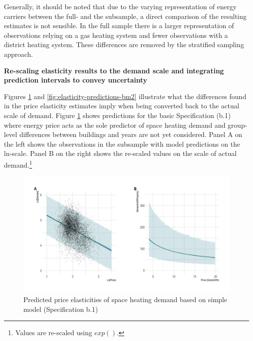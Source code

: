 \documentclass[12pt,twoside]{reedthesis}
\begin{document}
Generally, it should be noted that due to the varying representation of energy carriers between the full- and the subsample, a direct comparison of the resulting estimates is not sensible. In the full sample there is a larger representation of observations relying on a gas heating system and fewer observations with a district heating system. These differences are removed by the stratified sampling approach.

\textbf{Re-scaling elasticity results to the demand scale and integrating prediction intervals to convey uncertainty}

Figures \ref{fig:elasticity-predictions-b1} and \ref{fig:elasticity-predictions-bm2} illustrate what the differences found in the price elasticity estimates imply when being converted back to the actual scale of demand. Figure \ref{fig:elasticity-predictions-b1} shows predictions for the basic Specification (b.1) where energy price acts as the sole predictor of space heating demand and group-level differences between buildings and years are not yet considered. Panel A on the left shows the observations in the subsample with model predictions on the ln-scale. Panel B on the right shows the re-scaled values on the scale of actual demand.\footnote{Values are re-scaled using \(exp()\).}
\begin{figure}

{\centering \includegraphics[width=1\linewidth]{figure/b1_prediction} 

}

\caption{Predicted price elasticities of space heating demand based on simple model (Specification b.1)}\label{fig:elasticity-predictions-b1}
\end{figure}
\end{document}
